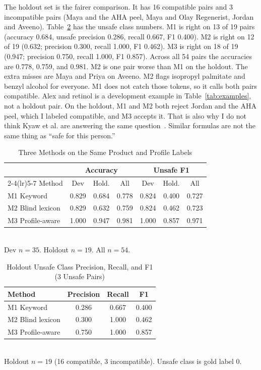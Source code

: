 \documentclass[conference]{IEEEtran}
\begin{document}
The holdout set is the fairer comparison. It has 16 compatible pairs and 3 incompatible pairs (Maya and the AHA peel, Maya and Olay Regenerist, Jordan and Aveeno). Table~\ref{tab:holdout} has the unsafe class numbers. M1 is right on 13 of 19 pairs (accuracy 0.684, unsafe precision 0.286, recall 0.667, F1 0.400). M2 is right on 12 of 19 (0.632; precision 0.300, recall 1.000, F1 0.462). M3 is right on 18 of 19 (0.947; precision 0.750, recall 1.000, F1 0.857). Across all 54 pairs the accuracies are 0.778, 0.759, and 0.981. M2 is one pair worse than M1 on the holdout. The extra misses are Maya and Priya on Aveeno. M2 flags isopropyl palmitate and benzyl alcohol for everyone. M1 does not catch those tokens, so it calls both pairs compatible. Alex and retinol is a development example in Table~\ref{tab:examples}, not a holdout pair. On the holdout, M1 and M2 both reject Jordan and the AHA peel, which I labeled compatible, and M3 accepts it. That is also why I do not think Kyaw et al. are answering the same question~\cite{kyaw2024incit}. Similar formulas are not the same thing as ``safe for this person.''

\begin{table}[t]
\caption{Three Methods on the Same Product and Profile Labels}
\label{tab:main}
\centering
\scriptsize
\begin{tabular}{@{}l ccc ccc@{}}
\toprule
 & \multicolumn{3}{c}{Accuracy} & \multicolumn{3}{c}{Unsafe F1} \\
\cmidrule(lr){2-4}\cmidrule(lr){5-7}
Method & Dev & Hold. & All & Dev & Hold. & All \\
\midrule
M1 Keyword & 0.829 & 0.684 & 0.778 & 0.824 & 0.400 & 0.727 \\
M2 Blind lexicon & 0.829 & 0.632 & 0.759 & 0.824 & 0.462 & 0.723 \\
M3 Profile-aware & 1.000 & 0.947 & 0.981 & 1.000 & 0.857 & 0.971 \\
\bottomrule
\end{tabular}\\[2pt]
{\scriptsize Dev $n{=}35$. Holdout $n{=}19$. All $n{=}54$.}
\end{table}

\begin{table}[t]
\caption{Holdout Unsafe Class Precision, Recall, and F1 (3 Unsafe Pairs)}
\label{tab:holdout}
\centering
\scriptsize
\begin{tabular}{@{}lccc@{}}
\toprule
Method & Precision & Recall & F1 \\
\midrule
M1 Keyword & 0.286 & 0.667 & 0.400 \\
M2 Blind lexicon & 0.300 & 1.000 & 0.462 \\
M3 Profile-aware & 0.750 & 1.000 & 0.857 \\
\bottomrule
\end{tabular}\\[2pt]
{\scriptsize Holdout $n{=}19$ (16 compatible, 3 incompatible). Unsafe class is gold label 0.}
\end{table}
\end{document}

